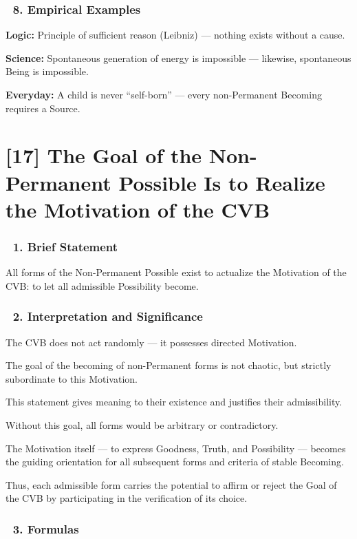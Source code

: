 \documentclass[12pt]{article}
\begin{document}
\subsubsection*{🔹 8. Empirical Examples}

\textbf{Logic:} Principle of sufficient reason (Leibniz) — nothing exists without a cause.

\textbf{Science:} Spontaneous generation of energy is impossible — likewise, spontaneous Being is impossible.

\textbf{Everyday:} A child is never ``self-born'' — every non-Permanent Becoming requires a Source.



\section*{[17] The Goal of the Non-Permanent Possible Is to Realize the Motivation of the CVB}

\subsubsection*{🔹 1. Brief Statement}

All forms of the Non-Permanent Possible exist to actualize the Motivation of the CVB: to let all admissible Possibility become.

\subsubsection*{🔹 2. Interpretation and Significance}

The CVB does not act randomly — it possesses directed Motivation.

The goal of the becoming of non-Permanent forms is not chaotic, but strictly subordinate to this Motivation.

This statement gives meaning to their existence and justifies their admissibility.

Without this goal, all forms would be arbitrary or contradictory.

The Motivation itself — to express Goodness, Truth, and Possibility — becomes the guiding orientation for all subsequent forms and criteria of stable Becoming.

Thus, each admissible form carries the potential to affirm or reject the Goal of the CVB by participating in the verification of its choice.

\subsubsection*{🔹 3. Formulas}
\end{document}
